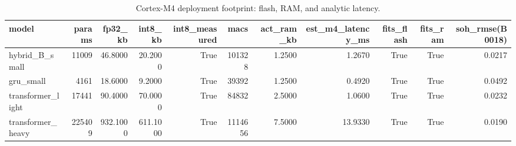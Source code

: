 \begin{table}
\caption{Cortex-M4 deployment footprint: flash, RAM, and analytic latency.}
\label{tab:cortex_m4_footprint}
\begin{tabular}{lrrrrrrrrrr}
\toprule
model & params & fp32\_kb & int8\_kb & int8\_measured & macs & act\_ram\_kb & est\_m4\_latency\_ms & fits\_flash & fits\_ram & soh\_rmse(B0018) \\
\midrule
hybrid\_B\_small & 11009 & 46.8000 & 20.2000 & True & 101328 & 1.2500 & 1.2670 & True & True & 0.0217 \\
gru\_small & 4161 & 18.6000 & 9.2000 & True & 39392 & 1.2500 & 0.4920 & True & True & 0.0492 \\
transformer\_light & 17441 & 90.4000 & 70.0000 & True & 84832 & 2.5000 & 1.0600 & True & True & 0.0232 \\
transformer\_heavy & 225409 & 932.1000 & 611.1000 & True & 1114656 & 7.5000 & 13.9330 & True & True & 0.0190 \\
\bottomrule
\end{tabular}
\end{table}
